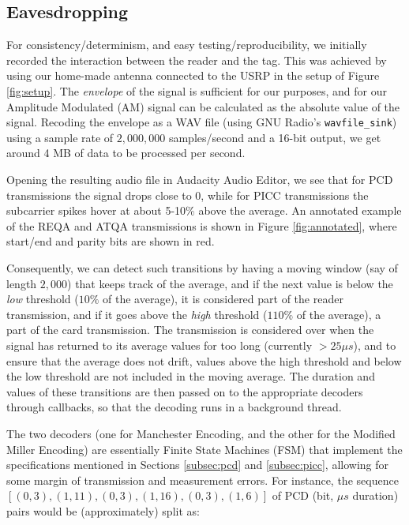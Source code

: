 \documentclass[fleqn,10pt]{SelfArx} %
\newcommand{\ms}{\ensuremath{\mu s} }
\begin{document}
\subsection{Eavesdropping}
\label{subsec:eavesdrop}

For consistency/determinism, and easy testing/reproducibility, we initially recorded the interaction between the reader and the tag. This was achieved by using our home-made antenna connected to the USRP in the setup of Figure \ref{fig:setup}. The {\em envelope} of the signal is sufficient for our purposes, and for our Amplitude Modulated (AM) signal can be calculated as the absolute value of the signal. Recoding the envelope as a WAV file (using GNU Radio's \texttt{wavfile\_sink}) using a sample rate of $2,000,000$ samples/second and a 16-bit output, we get around 4 MB of data to be processed per second.

Opening the resulting audio file in Audacity Audio Editor, we see that for PCD transmissions the signal drops close to 0, while for PICC transmissions the subcarrier spikes hover at about 5-10\% above the average. An annotated example of the REQA and ATQA transmissions is shown in Figure \ref{fig:annotated}, where start/end and parity bits are shown in red. 


Consequently, we can detect such transitions by having a moving window (say of length $2,000$) that keeps track of the average, and if the next value is below the {\em low} threshold ($10\%$ of the average), it is considered part of the reader transmission, and if it goes above the {\em high} threshold ($110\%$ of the average), a part of the card transmission. The transmission is considered over when the signal has returned to its average values for too long (currently $>25\ms$), and to ensure that the average does not drift, values above the high threshold and below the low threshold are not included in the moving average. The duration and values of these transitions are then passed on to the appropriate decoders through callbacks, so that the decoding runs in a background thread.

The two decoders (one for Manchester Encoding, and the other for the Modified Miller Encoding) are essentially Finite State Machines (FSM) that implement the specifications mentioned in Sections \ref{subsec:pcd} and \ref{subsec:picc}, allowing for some margin of transmission and measurement errors. For instance, the sequence $[(0, 3), (1, 11), (0, 3), (1, 16), (0, 3), (1, 6)]$ of PCD (bit, \ms duration) pairs would be (approximately) split as:
\end{document}
